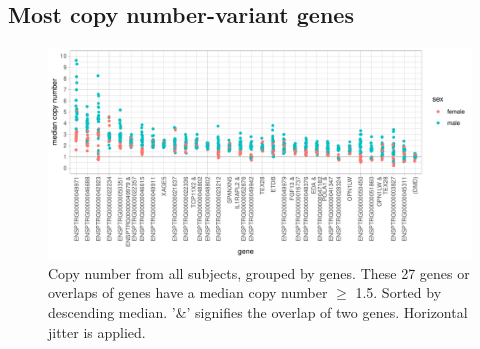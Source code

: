\subsection*{Most copy number-variant genes}


\begin{figure}[h] 
  \centering
  \includegraphics[scale=0.78]{figures/fig_main_median_3.pdf}
  \caption{Copy number from all subjects, grouped by genes. These 27 genes or overlaps of genes have a median copy number $\geq$ 1.5. Sorted by descending median. '\&' signifies the overlap of two genes. Horizontal jitter is applied. }
  \label{fig:fig_main}
\end{figure}


